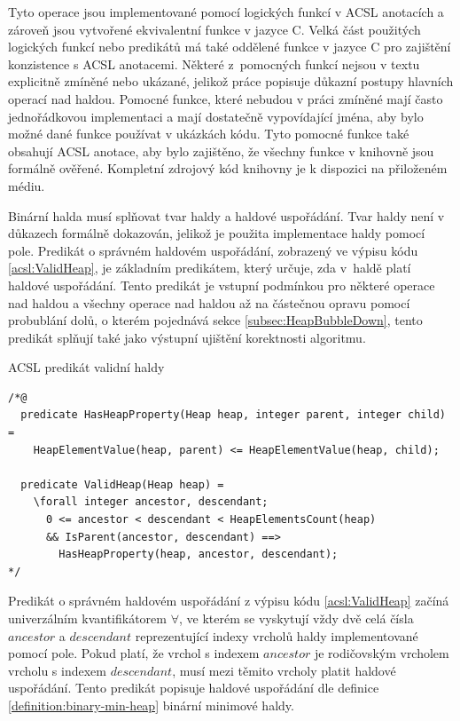 Tyto operace jsou implementované pomocí logických funkcí v ACSL anotacích a zároveň jsou vytvořené ekvivalentní funkce v jazyce C. Velká část použitých logických funkcí nebo predikátů má také oddělené funkce v jazyce C pro zajištění konzistence s ACSL anotacemi. Některé z~pomocných funkcí nejsou v textu explicitně zmíněné nebo ukázané, jelikož práce popisuje důkazní postupy hlavních operací nad haldou. Pomocné funkce, které nebudou v práci zmíněné mají často jednořádkovou implementaci a mají dostatečně vypovídající jména, aby bylo možné dané funkce používat v ukázkách kódu. Tyto pomocné funkce také obsahují ACSL anotace, aby bylo zajištěno, že všechny funkce v knihovně jsou formálně ověřené. Kompletní zdrojový kód knihovny je k dispozici na přiloženém médiu.

Binární halda musí splňovat tvar haldy a haldové uspořádání. Tvar haldy není v důkazech formálně dokazován, jelikož je použita implementace haldy pomocí pole. Predikát o správném haldovém uspořádání, zobrazený ve výpisu kódu \ref{acsl:ValidHeap}, je základním predikátem, který určuje, zda v~haldě platí haldové uspořádání. Tento predikát je vstupní podmínkou pro některé operace nad haldou a všechny operace nad haldou až na částečnou opravu pomocí probublání dolů, o kterém pojednává sekce \ref{subsec:HeapBubbleDown}, tento predikát splňují také jako výstupní ujištění korektnosti algoritmu.

\begin{listing}[H]
	\caption{ACSL predikát validní haldy}
	\label{acsl:ValidHeap}
	\begin{verbatim}
/*@
  predicate HasHeapProperty(Heap heap, integer parent, integer child) =
    HeapElementValue(heap, parent) <= HeapElementValue(heap, child);

  predicate ValidHeap(Heap heap) =
    \forall integer ancestor, descendant;
      0 <= ancestor < descendant < HeapElementsCount(heap)
      && IsParent(ancestor, descendant) ==>
        HasHeapProperty(heap, ancestor, descendant);
*/
	\end{verbatim}
\end{listing}

Predikát o správném haldovém uspořádání z výpisu kódu \ref{acsl:ValidHeap} začíná univerzálním kvantifikátorem $\forall$, ve kterém se vyskytují vždy dvě celá čísla $ancestor$ a $descendant$ reprezentující indexy vrcholů haldy implementované pomocí pole. Pokud platí, že vrchol s indexem $ancestor$ je rodičovským vrcholem vrcholu s indexem $descendant$, musí mezi těmito vrcholy platit haldové uspořádání. Tento predikát popisuje haldové uspořádání dle definice \ref{definition:binary-min-heap} binární minimové haldy. 

